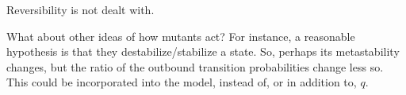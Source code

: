 \documentclass[twocolumn,floatfix,nofootinbib,aps]{revtex4-1}
\begin{document}
Reversibility is not dealt with.

What about other ideas of how mutants act? For instance, a reasonable hypothesis is that they destabilize/stabilize a state. So, perhaps its metastability changes, but the ratio of the outbound transition probabilities change less so. This could be incorporated into the model, instead of, or in addition to, $q$.
\end{document}
